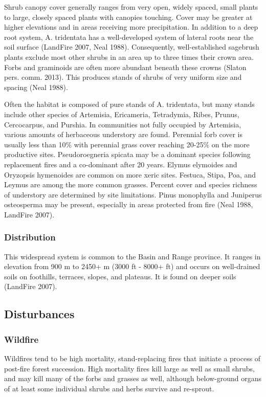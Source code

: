 Shrub canopy cover generally ranges from very open, widely spaced, small plants to large, closely spaced plants with canopies touching. Cover may be greater at higher elevations and in areas receiving more precipitation. In addition to a deep root system, A. tridentata has a well-developed system of lateral roots near the soil surface (LandFire 2007, Neal 1988). Consequently, well-established sagebrush plants exclude most other shrubs in an area up to three times their crown area. Forbs and graminoids are often more abundant beneath these crowns (Slaton pers. comm. 2013). This produces stands of shrubs of very uniform size and spacing (Neal 1988).

Often the habitat is composed of pure stands of A. tridentata, but many stands include other species of Artemisia, Ericameria, Tetradymia, Ribes, Prunus, Cercocarpus, and Purshia. In communities not fully occupied by Artemisia, various amounts of herbaceous understory are found. Perennial forb cover is usually less than 10\% with perennial grass cover reaching 20-25\% on the more productive sites. Pseudoroegneria spicata may be a dominant species following replacement fires and a co-dominant after 20 years. Elymus elymoides and Oryzopsis hymenoides are common on more xeric sites. Festuca, Stipa, Poa, and Leymus are among the more common grasses. Percent cover and species richness of understory are determined by site limitations. Pinus monophylla and Juniperus osteosperma may be present, especially in areas protected from fire (Neal 1988, LandFire 2007).


\subsubsection{Distribution}
This widespread system is common to the Basin and Range province. It ranges in elevation from 900 m to 2450+ m (3000 ft - 8000+ ft) and occurs on well-drained soils on foothills, terraces, slopes, and plateaus. It is found on deeper soils (LandFire 2007).

\subsection{Disturbances}


\subsubsection{Wildfire}
Wildfires tend to be high mortality, stand-replacing fires that initiate a process of post-fire forest succession. High mortality fires kill large as well as small shrubs, and may kill many of the forbs and grasses as well, although below-ground organs of at least some individual shrubs and herbs survive and re-sprout. 


